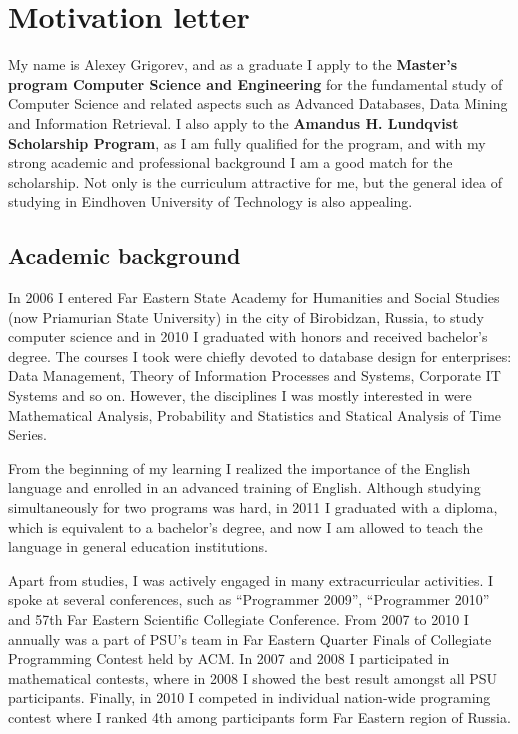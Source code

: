 \documentclass[a4paper,12pt]{article}
\begin{document}
\section*{Motivation letter}

My name is Alexey Grigorev, and as a graduate I apply to the \textbf{Master's program Computer Science and Engineering} for the fundamental study of Computer Science and related aspects such as Advanced Databases, Data Mining and Information Retrieval. I also apply to the \textbf{Amandus H. Lundqvist Scholarship Program}, as I am fully qualified for the program, and with my strong academic and professional background I am a good match for the scholarship. Not only is the curriculum attractive for me, but the general idea of studying in Eindhoven University of Technology is also appealing.

\subsection*{Academic background}

In 2006 I entered Far Eastern State Academy for Humanities and Social Studies (now Priamurian State University) in the city of Birobidzan, Russia, to study computer science and in 2010 I graduated with honors and received bachelor's degree. The courses I took were chiefly devoted to database design for enterprises: Data Management, Theory of Information Processes and Systems, Corporate IT Systems and so on. However, the disciplines I was mostly interested in were Mathematical Analysis, Probability and Statistics and Statical Analysis of Time Series.

From the beginning of my learning I realized the importance of the English language and enrolled in an advanced training of English. Although studying simultaneously for two programs was hard, in 2011 I graduated with a diploma, which is equivalent to a bachelor's degree, and now I am allowed to teach the language in general education institutions.

Apart from studies, I was actively engaged in many extracurricular activities. I spoke at several conferences, such as ``Programmer 2009'', ``Programmer 2010'' and 57th Far Eastern Scientific Collegiate Conference. From 2007 to 2010 I annually was a part of PSU's team in Far Eastern Quarter Finals of Collegiate Programming Contest held by ACM. In 2007 and 2008 I participated in mathematical contests, where in 2008 I showed the best result amongst all PSU participants. Finally, in 2010 I competed in individual nation-wide programing contest where I ranked 4th among participants form Far Eastern region of Russia.
\end{document}
